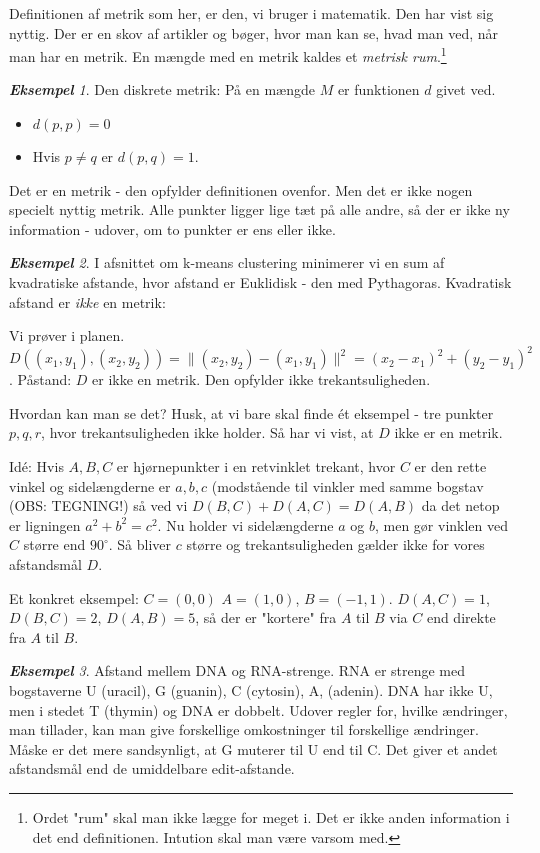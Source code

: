 \documentclass[a4paper, 12pt]{article}
\theoremstyle{remark}
\newtheorem{Eksempel}{\textbf{Eksempel}}
\begin{document}
Definitionen af metrik som her, er den, vi bruger i matematik. Den har vist sig nyttig. Der er en skov af artikler og bøger, hvor man kan se, hvad man ved, når man har  en metrik. En mængde med en metrik kaldes et \emph{metrisk rum}.\footnote{Ordet "rum"  skal man ikke lægge for meget i. Det er ikke anden information i det end definitionen. Intution skal man være varsom med.}
\begin{Eksempel}
Den diskrete metrik: På en mængde $M$ er funktionen $d$ givet ved. 
\begin{itemize}
\item $d(p,p)=0$
\item Hvis $p\neq q$ er $d(p,q)=1$.
\end{itemize}
Det er en metrik - den opfylder definitionen ovenfor. Men det er ikke nogen specielt nyttig metrik. Alle punkter ligger lige tæt på alle andre, så der er ikke ny information - udover, om  to punkter er ens eller ikke.
\end{Eksempel}
\begin{Eksempel} I afsnittet om k-means clustering minimerer vi en sum af kvadratiske afstande, hvor afstand er Euklidisk - den med Pythagoras. Kvadratisk afstand er \emph{ikke} en metrik: 

Vi prøver i planen. $D((x_1,y_1),(x_2,y_2))=\|(x_2,y_2)-(x_1,y_1)\|^2=(x_2-x_1)^2+(y_2-y_1)^2$. Påstand: $D$ er ikke en metrik. Den opfylder ikke trekantsuligheden.

Hvordan kan man se det? Husk, at vi bare skal finde ét eksempel - tre punkter $p,q,r$, hvor trekantsuligheden ikke holder. Så har vi vist, at $D$ ikke er en metrik. 

Idé: Hvis $A,B,C$ er hjørnepunkter i en retvinklet trekant, hvor $C$ er den rette vinkel og sidelængderne er $a,b,c$ (modstående til vinkler med samme bogstav (OBS: TEGNING!)
så ved vi $D(B,C)+D(A,C)=D(A,B)$ da det netop er ligningen $a^2+b^2=c^2$. Nu holder vi sidelængderne $a$ og $b$, men gør vinklen ved $C$ større end $90^\circ$. Så bliver $c$ større og trekantsuligheden gælder ikke for vores afstandsmål $D$.

Et konkret eksempel: $C=(0,0)$ $A=(1,0)$, $B=(-1,1)$. $D(A,C)=1$, $D(B,C)=2$, $D(A,B)=5$, så der er "kortere" fra $A$ til $B$ via $C$ end direkte fra $A$ til $B$.
\end{Eksempel}
\begin{Eksempel} Afstand mellem DNA og RNA-strenge. RNA er strenge med bogstaverne U (uracil), G (guanin), C (cytosin), A, (adenin). DNA har ikke U, men i stedet T (thymin) og DNA er dobbelt. 
 Udover regler for, hvilke ændringer, man tillader, kan man give forskellige omkostninger til forskellige ændringer. Måske er det mere sandsynligt, at G muterer til U  end til C. Det giver et andet afstandsmål end de umiddelbare edit-afstande. 
\end{Eksempel}
\end{document}
